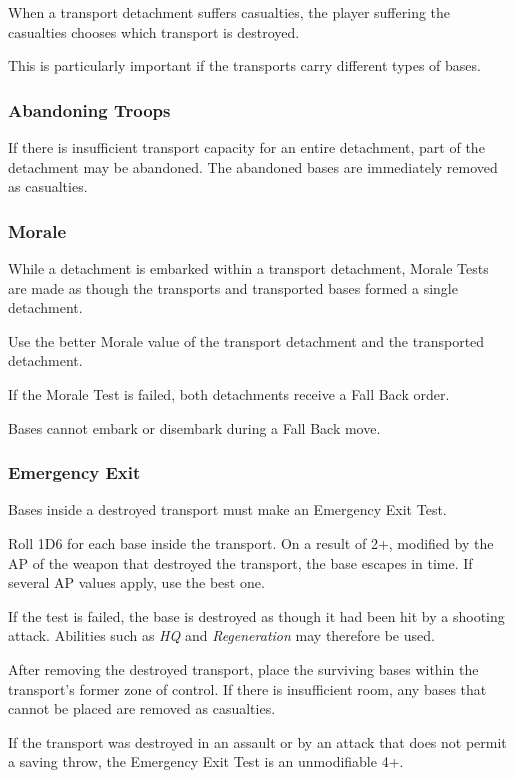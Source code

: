 When a transport detachment suffers casualties, the player suffering the casualties chooses which transport is destroyed.

This is particularly important if the transports carry different types of bases.

\subsubsection{Abandoning Troops}

If there is insufficient transport capacity for an entire detachment, part of the detachment may be abandoned. The abandoned bases are immediately removed as casualties.

\subsubsection{Morale}

While a detachment is embarked within a transport detachment, Morale Tests are made as though the transports and transported bases formed a single detachment.

Use the better Morale value of the transport detachment and the transported detachment.

If the Morale Test is failed, both detachments receive a Fall Back order.

Bases cannot embark or disembark during a Fall Back move.

\subsubsection{Emergency Exit}

Bases inside a destroyed transport must make an Emergency Exit Test.

Roll 1D6 for each base inside the transport. On a result of 2+, modified by the AP of the weapon that destroyed the transport, the base escapes in time. If several AP values apply, use the best one.

If the test is failed, the base is destroyed as though it had been hit by a shooting attack. Abilities such as \textit{HQ} and \textit{Regeneration} may therefore be used.

After removing the destroyed transport, place the surviving bases within the transport's former zone of control. If there is insufficient room, any bases that cannot be placed are removed as casualties.

If the transport was destroyed in an assault or by an attack that does not permit a saving throw, the Emergency Exit Test is an unmodifiable 4+.

